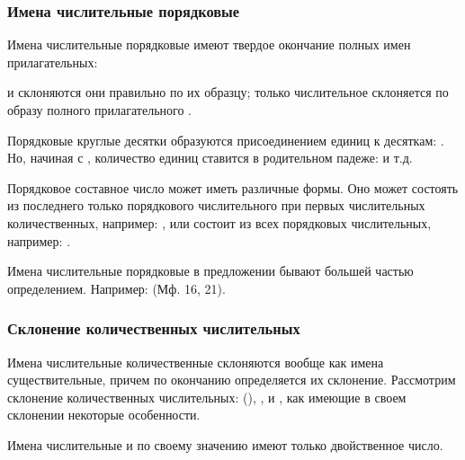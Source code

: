 \documentclass[11pt,a4paper,oneside]{memoir}
\begin{document}
                \subsubsection{Имена числительные порядковые}

    Имена числительные порядковые имеют твердое окончание полных имен прилагательных:
    
    \bigskip{}
    
    \noindent
    и склоняются они правильно по их образцу; только числительное {} склоняется по образу полного прилагательного {}.
    
    Порядковые круглые десятки образуются присоединением единиц к десяткам: {}. Но, начиная с {}, количество единиц ставится в родительном падеже: {} и т.д.
    
    Порядковое составное число может иметь различные формы. Оно может состоять из последнего только порядкового числительного при первых числительных количественных, например: {}, или состоит из всех порядковых числительных, например: {}.
    
    Имена числительные порядковые в предложении бывают большей частью определением. Например: {} (Мф. 16, 21).
    
                \subsubsection{Склонение количественных числительных}

    Имена числительные количественные склоняются вообще как имена существительные, причем по окончанию определяется их склонение. Рассмотрим склонение количественных числительных: {} ({}), {}, {} и {}, как имеющие в своем склонении некоторые особенности.
    
    Имена числительные {} и {} по своему значению имеют только двойственное число.
    
\end{document}

